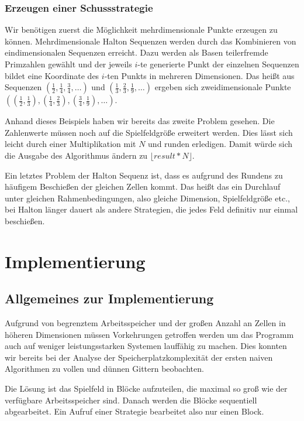 \documentclass[a4paper,12pt]{llncs}
\numberwithin{equation}{section}
\begin{document}
\subsubsection{Erzeugen einer Schussstrategie}
Wir benötigen zuerst die Möglichkeit mehrdimensionale Punkte erzeugen zu können. Mehrdimensionale Halton Sequenzen werden durch das Kombinieren von eindimensionalen Sequenzen erreicht. Dazu werden als Basen teilerfremde Primzahlen gewählt und der jeweils $i$-te generierte Punkt der einzelnen Sequenzen bildet eine Koordinate des $i$-ten Punkts in mehreren Dimensionen. Das heißt aus Sequenzen $\left(\frac{1}{2},\frac{1}{4},\frac{3}{4},\dots\right)$ und $\left(\frac{1}{3},\frac{2}{3},\frac{1}{9},\dots\right)$ ergeben sich zweidimensionale Punkte $\left(\left(\frac{1}{2},\frac{1}{3}\right),\left(\frac{1}{4},\frac{2}{3}\right),\left(\frac{3}{4},\frac{1}{9}\right),\dots\right)$.

Anhand dieses Beispiels haben wir bereits das zweite Problem gesehen. Die Zahlenwerte müssen noch auf die Spielfeldgröße erweitert werden. Dies lässt sich leicht durch einer Multiplikation mit $N$ und runden erledigen. Damit würde sich die Ausgabe des Algorithmus ändern zu $\lfloor result * N \rfloor$.

Ein letztes Problem der Halton Sequenz ist, dass es aufgrund des Rundens zu häufigem Beschießen der gleichen Zellen kommt. Das heißt das ein Durchlauf unter gleichen Rahmenbedingungen, also gleiche Dimension, Spielfeldgröße etc., bei Halton länger dauert als andere Strategien, die jedes Feld definitiv nur einmal beschießen. 
 

\section{Implementierung}

\subsection{Allgemeines zur Implementierung}
Aufgrund von begrenztem Arbeitsspeicher und der großen Anzahl an Zellen in höheren Dimensionen müssen Vorkehrungen getroffen werden um das Programm auch auf weniger leistungsstarken Systemen lauffähig zu machen. Dies konnten wir bereits bei der Analyse der Speicherplatzkomplexität der ersten naiven Algorithmen zu vollen und dünnen Gittern beobachten. 

Die Lösung ist das Spielfeld in Blöcke aufzuteilen, die maximal so groß wie der verfügbare Arbeitsspeicher sind. Danach werden die Blöcke sequentiell abgearbeitet. Ein Aufruf einer Strategie bearbeitet also nur einen Block.
\end{document}
